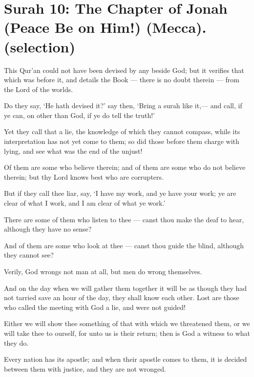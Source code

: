 \documentclass[fontsize=14pt, letterpaper, notitlepage, openany, DIV=12]{scrbook} %
\begin{document}
\section[Surah 10: The Chapter of Jonah (Peace Be on Him!) (Mecca).]{Surah 10: The Chapter of Jonah (Peace Be on Him!) (Mecca).\\ (selection)}


\noindent[10:37]
This Qur'an could not have been devised by any beside God; but it verifies that which
was before it, and details the Book --- there is no doubt therein --- from the Lord of the worlds.

\noindent[10:38]
Do they say, `He hath devised it?' say then, `Bring a surah like it,--- and call, if ye can,
on other than God, if ye do tell the truth!'

\noindent[10:39]
Yet they call that a lie, the knowledge of which they cannot compass, while its
interpretation has not yet come to them; so did those before them charge with lying, and see what
was the end of the unjust!

\noindent[10:40]
Of them are some who believe therein; and of them are some who do not believe therein;
but thy Lord knows best who are corrupters.

\noindent[10:41]
But if they call thee liar, say, `I have my work, and ye have your work; ye are clear of
what I work, and I am clear of what ye work.'

\noindent[10:42]
There are some of them who listen to thee --- canst thou make the deaf to hear, although
they have no sense?

\noindent[10:43]
And of them are some who look at thee --- canst thou guide the blind, although they
cannot see?

\noindent[10:44]
Verily, God wrongs not man at all, but men do wrong themselves.

\noindent[10:45]
And on the day when we will gather them together it will be as though they had not
tarried save an hour of the day, they shall know each other. Lost are those who called the
meeting with God a lie, and were not guided!

\noindent[10:46]
Either we will show thee something of that with which we threatened them, or we will
take thee to ourself, for unto us is their return; then is God a witness to what they do.

\noindent[10:47]
Every nation has its apostle; and when their apostle comes to them, it is decided between
them with justice, and they are not wronged.
\end{document}

